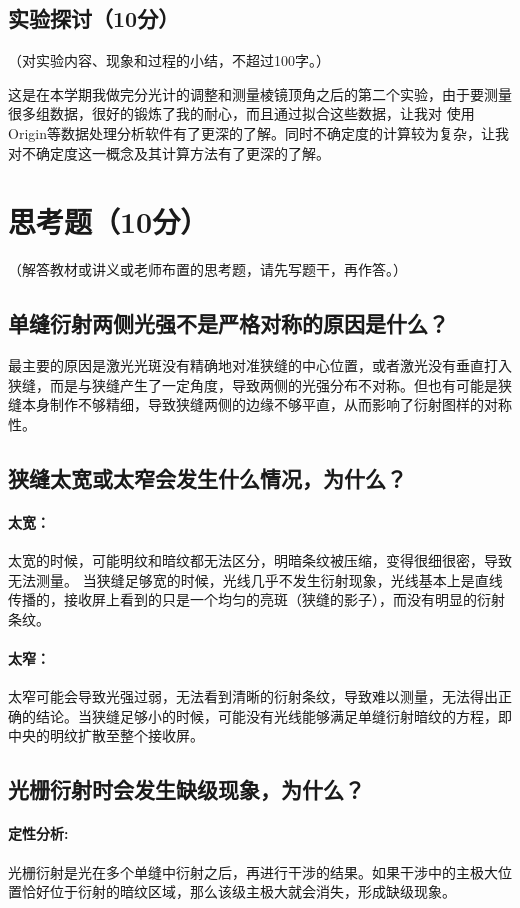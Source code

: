 \documentclass[]{../../templates/Report}%
\begin{document}
\begin{fullreportonly}
\subsection{实验探讨（10分）}
（对实验内容、现象和过程的小结，不超过100字。）

这是在本学期我做完分光计的调整和测量棱镜顶角之后的第二个实验，由于要测量很多组数据，很好的锻炼了我的耐心，而且通过拟合这些数据，让我对
使用Origin等数据处理分析软件有了更深的了解。同时不确定度的计算较为复杂，让我对不确定度这一概念及其计算方法有了更深的了解。
\section{思考题（10分）}
（解答教材或讲义或老师布置的思考题，请先写题干，再作答。）
\subsection{单缝衍射两侧光强不是严格对称的原因是什么？}
最主要的原因是激光光斑没有精确地对准狭缝的中心位置，或者激光没有垂直打入狭缝，而是与狭缝产生了一定角度，导致两侧的光强分布不对称。但也有可能是狭缝本身制作不够精细，导致狭缝两侧的边缘不够平直，从而影响了衍射图样的对称性。
\subsection{狭缝太宽或太窄会发生什么情况，为什么？}
\paragraph{太宽：}
太宽的时候，可能明纹和暗纹都无法区分，明暗条纹被压缩，变得很细很密，导致无法测量。
当狭缝足够宽的时候，光线几乎不发生衍射现象，光线基本上是直线传播的，接收屏上看到的只是一个均匀的亮斑（狭缝的影子），而没有明显的衍射条纹。
\paragraph{太窄：}
太窄可能会导致光强过弱，无法看到清晰的衍射条纹，导致难以测量，无法得出正确的结论。当狭缝足够小的时候，可能没有光线能够满足单缝衍射暗纹的方程，即中央的明纹扩散至整个接收屏。
\subsection{光栅衍射时会发生缺级现象，为什么？}
\paragraph{定性分析:}
光栅衍射是光在多个单缝中衍射之后，再进行干涉的结果。如果干涉中的主极大位置恰好位于衍射的暗纹区域，那么该级主极大就会消失，形成缺级现象。

\end{fullreportonly}
\end{document}
